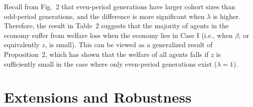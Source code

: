 \documentclass[nogrid]{MBE}%
\begin{document}
{%



Recall from Fig.~2 that even-period generations have larger cohort sizes than odd-period
generations, and the difference is more significant when $\lambda$ is higher. Therefore, the
result in Table~2 suggests that the majority of agents in the economy suffer from welfare loss
when the economy lies in Case I (i.e., when $\beta$, or equivalently $z$, is small). This can be
viewed as a generalized result of Proposition~2, which has shown that the welfare of all agents
falls if $z$ is sufficiently small in the case where only even-period generations exist
($\lambda=1$).


\section{Extensions and Robustness \label{sec:Robustness}}

}
\end{document}
